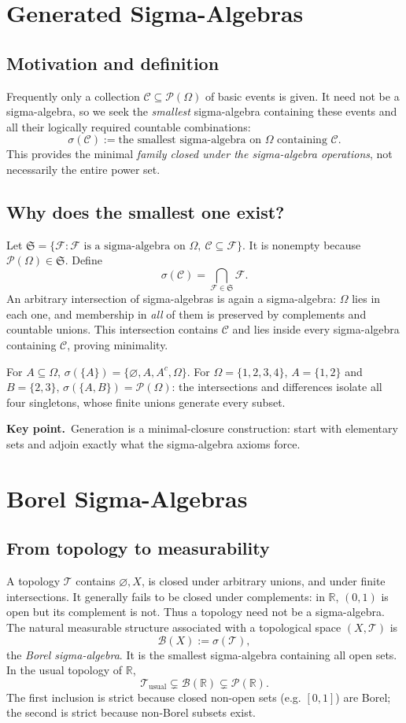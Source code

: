 \documentclass[10pt,a4paper]{article}
\newcommand{\R}{\mathbb R}
\newcommand{\PO}{\mathcal P(\Omega)}
\newcommand{\B}{\mathcal B}
\newcommand{\key}[1]{\par\smallskip\textcolor{accent}{\textbf{Key point.}}\ #1\par}
\begin{document}
\section{Generated Sigma-Algebras}
\subsection{Motivation and definition}
Frequently only a collection $\mathcal C\subseteq\PO$ of basic events is given.
It need not be a sigma-algebra, so we seek the \emph{smallest} sigma-algebra
containing these events and all their logically required countable combinations:
\[
\boxed{\sigma(\mathcal C)
:=\text{the smallest sigma-algebra on $\Omega$ containing $\mathcal C$}.}
\]
This provides the minimal \emph{family closed under the sigma-algebra
operations}, not necessarily the entire power set.

\subsection{Why does the smallest one exist?}
Let $\mathfrak S=\{\mathcal F:\mathcal F\text{ is a sigma-algebra on }\Omega,
\ \mathcal C\subseteq\mathcal F\}$. It is nonempty because
$\PO\in\mathfrak S$. Define
\[
\boxed{\sigma(\mathcal C)=\bigcap_{\mathcal F\in\mathfrak S}\mathcal F.}
\]
An arbitrary intersection of sigma-algebras is again a sigma-algebra:
$\Omega$ lies in each one, and membership in \emph{all} of them is preserved
by complements and countable unions. This intersection contains $\mathcal C$
and lies inside every sigma-algebra containing $\mathcal C$, proving minimality.

For $A\subseteq\Omega$, $\sigma(\{A\})=\{\varnothing,A,A^c,\Omega\}$.
For $\Omega=\{1,2,3,4\}$, $A=\{1,2\}$ and $B=\{2,3\}$,
$\sigma(\{A,B\})=\PO$: the intersections and differences isolate all four
singletons, whose finite unions generate every subset.

\key{Generation is a minimal-closure construction: start with elementary sets and adjoin exactly what the sigma-algebra axioms force.}

\section{Borel Sigma-Algebras}
\subsection{From topology to measurability}
A topology $\mathcal T$ contains $\varnothing,X$, is closed under arbitrary
unions, and under finite intersections. It generally fails to be closed under
complements: in $\R$, $(0,1)$ is open but its complement is not.
Thus a topology need not be a sigma-algebra. The natural measurable structure
associated with a topological space $(X,\mathcal T)$ is
\[
\boxed{\B(X):=\sigma(\mathcal T),}
\]
the \emph{Borel sigma-algebra}. It is the smallest sigma-algebra containing all
open sets. In the usual topology of $\R$,
\[
\boxed{\mathcal T_{\mathrm{usual}}
\subsetneq\B(\R)\subsetneq\mathcal P(\R).}
\]
The first inclusion is strict because closed non-open sets (e.g. $[0,1]$)
are Borel; the second is strict because non-Borel subsets exist.
\end{document}
